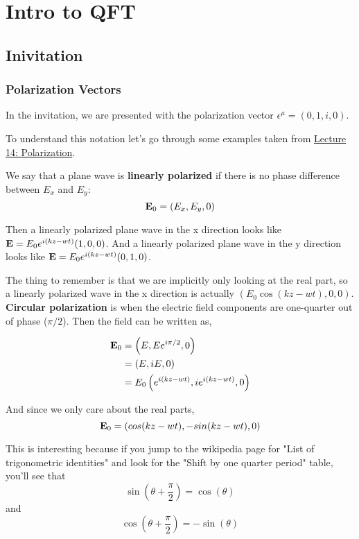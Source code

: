 \chapter{Intro to QFT}

\section{Inivitation}

\subsection{Polarization Vectors} \label{section:polarized-vectors}

In the invitation, we are presented with the polarization vector $\epsilon^\mu = (0, 1, i, 0)$.

To understand this notation let's go through some examples taken from
\href{https://scholar.harvard.edu/files/schwartz/files/lecture14-polarization.pdf}{Lecture 14: Polarization}.

We say that a plane wave is \textbf{linearly polarized} if there is no phase difference between $E_x$ and $E_y$:
$$
\boldsymbol{\mathbf{E}}_0 = \left( E_x, E_y, 0 \right)
$$

Then a linearly polarized plane wave in the x direction looks like $\boldsymbol{\mathbf{E}} = E_0 e^{i(kz-wt)} (1, 0, 0)$.
And a linearly polarized plane wave in the y direction looks like $\boldsymbol{\mathbf{E}} = E_0 e^{i(kz-wt)} (0, 1, 0)$.

The thing to remember is that we are implicitly only looking at the real part, so a linearly polarized wave in the x
direction is actually $(E_0 \cos(kz-wt), 0, 0)$.
\\

\textbf{Circular polarization} is when the electric field components are one-quarter out of phase ($\pi /2$).
Then the field can be written as,

\begin{align*}
\boldsymbol{\mathbf{E}}_0 &= \left( E, E e^{i\pi/2}, 0 \right) \\
&= \left( E, iE, 0 \right) \\
&= E_0 \left( e^{i(kz-wt)}, ie^{i(kz-wt)}, 0 \right)
\end{align*}

And since we only care about the real parts,
$$
\boldsymbol{\mathbf{E}}_0 = \left( cos(kz-wt), -sin(kz-wt), 0 \right)
$$

This is interesting because if you jump to the wikipedia page for "List of trigonometric identities"
and look for the "Shift by one quarter period" table, you'll see that
$$
\sin(\theta + \frac{\pi}{2}) = \cos(\theta)
$$
and
$$
\cos(\theta + \frac{\pi}{2}) = -\sin(\theta)
$$

